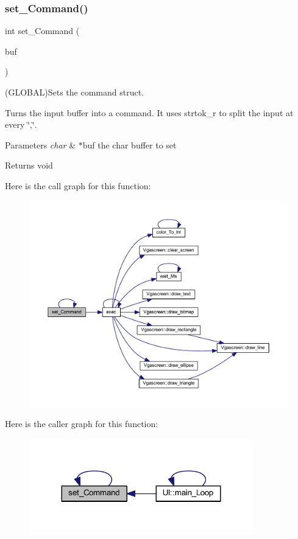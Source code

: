 \subsubsection{\texorpdfstring{set\+\_\+\+Command()}{set\_Command()}}
{\footnotesize\ttfamily int set\+\_\+\+Command (\begin{DoxyParamCaption}\item[{char $\ast$}]{buf }\end{DoxyParamCaption})}



(G\+L\+O\+B\+AL)Sets the command struct. 

Turns the input buffer into a command. It uses strtok\+\_\+r to split the input at every \char`\"{},\char`\"{}.


\begin{DoxyParams}{Parameters}
{\em char} & $\ast$buf the char buffer to set \\
\hline
\end{DoxyParams}
\begin{DoxyReturn}{Returns}
void 
\end{DoxyReturn}
Here is the call graph for this function\+:\nopagebreak
\begin{figure}[H]
\begin{center}
\leavevmode
\includegraphics[width=350pt]{namespace_l_l_a487e020844f801061abc930461b1ff2b_cgraph}
\end{center}
\end{figure}
Here is the caller graph for this function\+:\nopagebreak
\begin{figure}[H]
\begin{center}
\leavevmode
\includegraphics[width=275pt]{namespace_l_l_a487e020844f801061abc930461b1ff2b_icgraph}
\end{center}
\end{figure}
